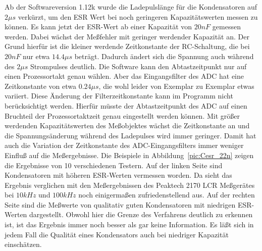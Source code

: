 Ab der Softwareversion 1.12k wurde die Ladepulslänge für die Kondensatoren auf \(2\mu s\) verkürzt, um den ESR Wert bei noch 
geringeren Kapazitätswerten messen zu können. Es kann jetzt der ESR-Wert ab einer Kapazität von \(20nF\) gemessen werden.
Dabei wächst der Meßfehler mit geringer werdender Kapazität an. Der Grund hierfür ist die kleiner werdende Zeitkonstante
der RC-Schaltung, die bei \(20nF\) nur etwa \(14.4\mu s\) beträgt. Dadurch ändert sich die Spannung auch während des
\(2\mu s\) Strompulses deutlich.
Die Software kann den Abtastzeitpunkt nur auf einen Prozessortakt genau wählen. Aber das Eingangsfilter
des ADC hat eine Zeitkonstante von etwa \(0.24\mu s\), die wohl leider von Exemplar zu Exemplar etwas variiert.
Diese Änderung der Filterzeitkonstante kann im Programm nicht berücksichtigt werden.
Hierfür müsste der Abtastzeitpunkt des ADC auf einen Bruchteil der Prozessortaktzeit genau eingestellt werden können.
Mit größer werdenden Kapazitätswerten
des Meßobjektes wächst die Zeitkonstante an und die Spannungsänderung während des Ladepulses wird immer geringer.
Damit hat auch die Variation der Zeitkonstante des ADC-Eingangsfilters immer weniger Einfluß auf die Meßergebnisse.
Die Beispiele in Abbildung~\ref{pic:Cesr_22n} zeigen die Ergebnisse von 10 verschiedenen Testern. Auf der linken Seite
sind Kondensatoren mit höheren ESR-Werten vermessen worden. Da sieht das Ergebnis verglichen mit den
Meßergebnissen des Peaktech 2170 LCR Meßgerätes bei \(10kHz\) und \(100kHz\) noch einigermaßen zufriedenstellend aus.
Auf der rechten Seite sind die Meßwerte von qualitativ guten Kondensatoren mit niedrigen ESR-Werten dargestellt.
Obwohl hier die Grenze des Verfahrens deutlich zu erkennen ist, ist das Ergebnis immer noch besser als gar keine Information.
Es läßt sich in jedem Fall die Qualität eines Kondensators auch bei niedriger Kapazität einschätzen.

